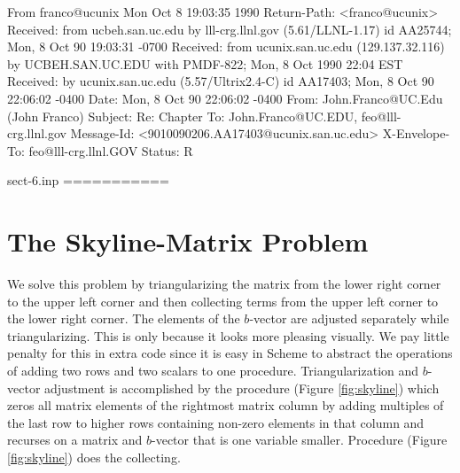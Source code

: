 From franco@ucunix Mon Oct  8 19:03:35 1990
Return-Path: <franco@ucunix>
Received: from ucbeh.san.uc.edu by lll-crg.llnl.gov (5.61/LLNL-1.17)
	id AA25744; Mon, 8 Oct 90 19:03:31 -0700
Received: from ucunix.san.uc.edu (129.137.32.116) by UCBEH.SAN.UC.EDU with
 PMDF-822; Mon, 8 Oct 1990 22:04 EST
Received: by ucunix.san.uc.edu (5.57/Ultrix2.4-C) id AA17403; Mon, 8 Oct 90
 22:06:02 -0400
Date: Mon, 8 Oct 90 22:06:02 -0400
From: John.Franco@UC.Edu (John Franco)
Subject: Re:  Chapter
To: John.Franco@UC.EDU, feo@lll-crg.llnl.gov
Message-Id: <9010090206.AA17403@ucunix.san.uc.edu>
X-Envelope-To: feo@lll-crg.llnl.GOV
Status: R

sect-6.inp
===========
\section{The Skyline-Matrix Problem}

We solve this problem by triangularizing the matrix from the lower right
corner to the upper left corner and then collecting terms from the upper
left corner to the lower right corner. The elements of the $b$-vector are
adjusted separately while triangularizing.  This is only because it looks
more pleasing visually.  We pay little penalty for this in extra
code since it is easy in Scheme to abstract the operations of adding two rows
and two scalars to one procedure.  Triangularization and $b$-vector
adjustment is accomplished by the procedure 
(Figure \ref{fig:skyline}) which zeros all
matrix elements of the rightmost matrix column by adding multiples of the last
row to higher rows containing non-zero elements in that column and recurses on
a matrix and $b$-vector that is one variable smaller.  Procedure 
(Figure \ref{fig:skyline}) does the collecting.

